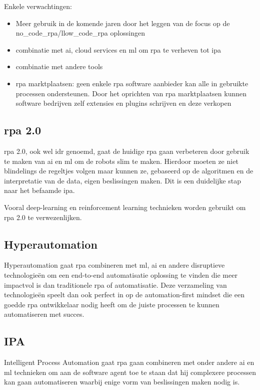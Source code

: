 Enkele verwachtingen:
\begin{itemize}
	\item Meer gebruik in de komende jaren door het leggen van de focus op de \gls{no_code_rpa}/l\gls{low_code_rpa} oplossingen 
	\item combinatie met \acrshort{ai}, cloud services en \acrshort{ml} om \acrshort{rpa} te verheven tot \acrshort{ipa}
	\item combinatie met andere tools
	\item \acrshort{rpa} marktplaatsen: geen enkele \acrshort{rpa} software aanbieder kan alle in gebruikte processen ondersteunen. Door het oprichten van \acrshort{rpa} marktplaatsen kunnen software bedrijven zelf extensies en plugins schrijven en deze verkopen
\end{itemize} \autocite{futureRPA}\autocite{everythingRPA}

\subsection{\acrshort{rpa} 2.0}
\acrshort{rpa} 2.0, ook wel \acrfull{idr} genoemd, gaat de huidige \acrshort{rpa} gaan verbeteren door gebruik te maken van  \acrshort{ai} en  \acrshort{ml} om de robots slim te maken. Hierdoor moeten ze niet blindelings de regeltjes volgen maar kunnen ze, gebaseerd op de algoritmen en de interpretatie van de data, eigen beslissingen maken. Dit is een duidelijke stap naar het befaamde  \acrshort{ipa}. \autocite{idrRPA}

Vooral deep-learning en reinforcement learning technieken worden gebruikt om \acrshort{rpa} 2.0 te verwezenlijken. \autocite{idrRPA}

\subsection{Hyperautomation}
Hyperautomation gaat \acrshort{rpa} combineren met  \acrshort{ml},  \acrshort{ai} en andere disruptieve technologieën om een end-to-end automatisatie oplossing te vinden die meer impactvol is dan traditionele \acrshort{rpa} of automatisatie. Deze verzameling van technologieën speelt dan ook perfect in op de automation-first mindset die een goedde \acrshort{rpa} ontwikkelaar nodig heeft om de juiste processen te kunnen automatiseren met succes. \autocite{hyperautomation}

\subsection{IPA}
Intelligent Process Automation gaat \acrshort{rpa} gaan combineren met onder andere  \acrshort{ai} en  \acrshort{ml} technieken om aan de software agent toe te staan dat hij complexere processen kan gaan automatiseren waarbij enige vorm van beslissingen maken nodig is.

